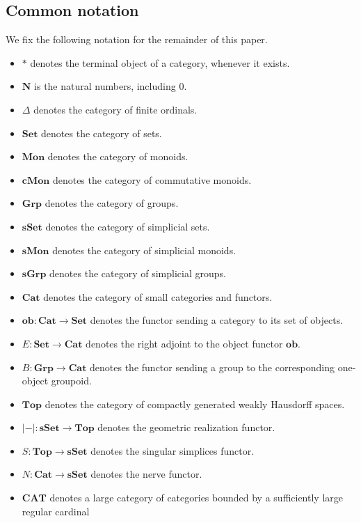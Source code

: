 \documentclass{tac}
\begin{document}
\subsection*{Common notation}

We fix the following notation for the remainder of this paper.

\begin{itemize}
    \item $*$ denotes the terminal object of a category, whenever it exists.
    \item $\mathbf{N}$ is the natural numbers, including $0$.
    \item $\Delta$ denotes the category of finite ordinals.
    \item $\mathbf{Set}$ denotes the category of sets.
    \item $\mathbf{Mon}$ denotes the category of monoids.
    \item $\mathbf{cMon}$ denotes the category of commutative monoids.
    \item $\mathbf{Grp}$ denotes the category of groups.
    \item $\mathbf{sSet}$ denotes the category of simplicial sets.
    \item $\mathbf{sMon}$ denotes the category of simplicial monoids.
    \item $\mathbf{sGrp}$ denotes the category of simplicial groups.
    \item $\mathbf{Cat}$ denotes the category of small categories and functors.
    \item $\mathbf{ob}:\mathbf{Cat}\to\mathbf{Set}$ denotes the functor sending a category to its set of objects.
    \item $E:\mathbf{Set}\to\mathbf{Cat}$ denotes the right adjoint to the object functor $\mathbf{ob}$.
    \item $B:\mathbf{Grp}\to\mathbf{Cat}$ denotes the functor sending a group to the corresponding one-object groupoid.
    \item $\mathbf{Top}$ denotes the category of compactly generated weakly Hausdorff spaces.
    \item $|-|:\mathbf{sSet}\to\mathbf{Top}$ denotes the geometric realization functor.
    \item $S:\mathbf{Top}\to\mathbf{sSet}$ denotes the singular simplices functor.
    \item $N:\mathbf{Cat}\to\mathbf{sSet}$ denotes the nerve functor.
    \item $\mathbf{CAT}$ denotes a large category of categories bounded by a sufficiently large regular cardinal
\end{itemize}
\end{document}
